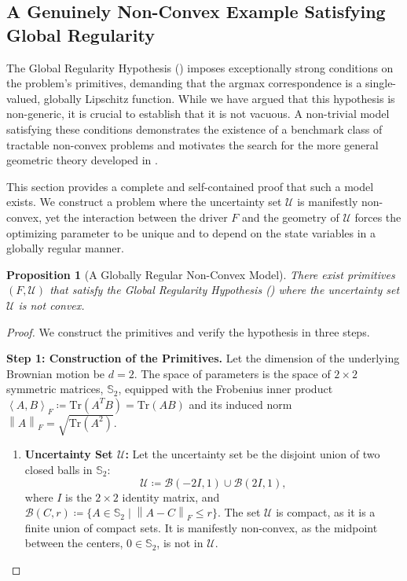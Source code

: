 \documentclass[12pt, letterpaper]{amsart}
\newcommand{\Ucal}{\mathcal{U}}
\newcommand{\Bcal}{\mathcal{B}}
\newcommand{\norm}[1]{\left\lVert#1\right\rVert}
\newcommand{\scpr}[2]{\left\langle #1, #2 \right\rangle}
\newcommand{\Tr}{\mathrm{Tr}}
\theoremstyle{plain}
\newtheorem{proposition}[theorem]{Proposition}
\theoremstyle{definition}
\theoremstyle{remark}
\numberwithin{equation}{section} %
\begin{document}
\begin{appendices}


\section{A Genuinely Non-Convex Example Satisfying Global Regularity}
\label{app:nonconvex_example_detailed}

The Global Regularity Hypothesis () imposes exceptionally strong conditions on the problem's primitives, demanding that the argmax correspondence is a single-valued, globally Lipschitz function. While we have argued that this hypothesis is non-generic, it is crucial to establish that it is not vacuous. A non-trivial model satisfying these conditions demonstrates the existence of a benchmark class of tractable non-convex problems and motivates the search for the more general geometric theory developed in .

This section provides a complete and self-contained proof that such a model exists. We construct a problem where the uncertainty set \(\Ucal\) is manifestly non-convex, yet the interaction between the driver \(F\) and the geometry of \(\Ucal\) forces the optimizing parameter to be unique and to depend on the state variables in a globally regular manner.

\begin{proposition}[A Globally Regular Non-Convex Model]
\label{prop:non_convex_global_regularity}
There exist primitives \((F, \Ucal)\) that satisfy the Global Regularity Hypothesis () where the uncertainty set \(\Ucal\) is not convex.
\end{proposition}

\begin{proof}
We construct the primitives and verify the hypothesis in three steps.

\vspace{1ex}
\noindent\textbf{Step 1: Construction of the Primitives.}
Let the dimension of the underlying Brownian motion be \(d=2\). The space of parameters is the space of \(2 \times 2\) symmetric matrices, \(\mathbb{S}_2\), equipped with the Frobenius inner product \(\scpr{A}{B}_F \coloneqq \Tr(A^T B) = \Tr(AB)\) and its induced norm \(\norm{A}_F = \sqrt{\Tr(A^2)}\).

\begin{enumerate}[label=(\alph*)]
    \item \textbf{Uncertainty Set \(\Ucal\):} Let the uncertainty set be the disjoint union of two closed balls in \(\mathbb{S}_2\):
    \[
        \Ucal \coloneqq \Bcal(-2I, 1) \cup \Bcal(2I, 1),
    \]
    where \(I\) is the \(2 \times 2\) identity matrix, and \(\Bcal(C,r) \coloneqq \{A \in \mathbb{S}_2 \mid \norm{A-C}_F \le r\}\). The set \(\Ucal\) is compact, as it is a finite union of compact sets. It is manifestly non-convex, as the midpoint between the centers, \(0 \in \mathbb{S}_2\), is not in \(\Ucal\).


\end{enumerate}
\end{proof}
\end{appendices}
\end{document}
